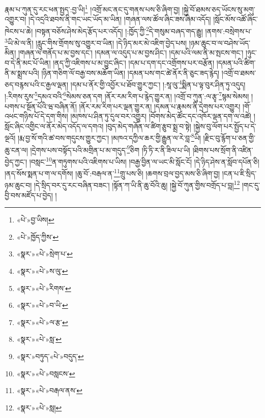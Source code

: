 རྣམ་པ་ཀུན་དུ་རང་ཕན་སྤྱད་:བྱ་ཡི།\footnote{«པེ་»བྱ་ཡིས།} །འགྲོ་མང་ནང་དུ་གནས་པས་ཅི་ཞིག་བྱ། །སྐྱེ་བོ་ཐམས་ཅད་ཡོངས་སུ་མགུ་འགྱུར་བ། །དེ་འདྲའི་ཐབས་ནི་གང་ཡང་ཡོད་མ་ཡིན། །གཞན་ལས་ཚོལ་ཞིང་ཟས་ཞིམ་འདོད། །སློང་མོས་འཚོ་ཞིང་ཁེངས་པ་ཆེ། །བསྟན་བཅོས་ཤེས་མེད་རྩོད་པར་འདོད། །:ཁྱོད་ཀྱི་\footnote{«པེ་»ཁྱོད་ཀྱིས་}དེ་གསུམ་བཞད་གད་རྒྱུ། །ནགས་:བསྲེགས་པ་\footnote{«སྣར་»«པེ་»སྲེག་པ་}ཡི་མེ་ལ་ནི། །རླུང་གིས་གྲོགས་སུ་འགྱུར་བ་ཡིན། །དེ་ཉིད་མར་མེ་འཇིག་བྱེད་པས། །ཉམ་ཆུང་བ་ལ་བཤེས་ཡོད་མིན། །གཞན་ལ་གནོད་པ་མ་བྱས་དང་། །དམན་ལ་འདུད་པ་མ་བྱས་ཤིང་། །དམ་པའི་ལམ་ནི་མ་སྤངས་གང་། །ཉུང་བ་དེ་ནི་མང་པོ་ཡིན། །ནད་ཀྱི་འཇིགས་པ་མ་བྱུང་ཞིང་། །དམ་པ་དག་དང་འགྲོགས་པར་བརྩོན། །དམན་པའི་ཚིག་ནི་མ་སྨྲས་པའི། །ཉིན་གཅིག་ལོ་བརྒྱ་བས་མཆོག་ཡིན། །དམན་པས་གང་ཚེ་ནོར་ནི་ཅུང་ཟད་རྙེད། །འགྲོ་བ་ཐམས་ཅད་བརྙས་པའི་ང་རྒྱལ་ལྡན། །དམ་པ་ནོར་གྱི་འབྱོར་པ་ཐོབ་གྱུར་ཀྱང་། །:སཱ་ལུ་\footnote{«སྣར་»«པེ་»ས་ལུ་}སྨིན་པ་ལྟ་བུར་ཤིན་ཏུ་འདུད། །:རིགས་རུས་\footnote{«སྣར་»«པེ་»རིགས་}དམའ་བའི་\footnote{«སྣར་»«པེ་»བ་ཡི་}སེམས་ཅན་དག །ནོར་རམ་རིག་པ་རྙེད་གྱུར་ན། །འགྲོ་བ་ཀུན་:ལ་རྩྭ་\footnote{«སྣར་»«པེ་»ལ་རྩ་}སྙམ་སེམས། །པགས་པ་སྔོན་པོའི་ཝ་བཞིན་ནོ། །ནོར་རམ་རིག་པར་ལྡན་གྱུར་ན། །དམན་པ་རྣམས་ནི་དྲེགས་པར་འགྱུར། །གོ་འཕང་གཉིས་པོ་དེ་དག་གིས། །མཁས་པ་ཤིན་ཏུ་དུལ་བར་འགྱུར། །བོགས་མེད་ཚོང་དང་འཁོར་ལྡན་དག་ལ་འཚེ། །སློང་ཞིང་འགྱིང་ལ་ནོར་མེད་འདོད་ལ་དགའ། །བུད་མེད་གཞོན་ལ་ཚིག་རྩུབ་སྨྲ་བ་སྟེ། །སྐྱེས་བུ་ལོག་པར་སྤྱོད་པ་དེ་ལྔའོ། །རྨ་བྱ་སོ་གའི་ཚ་བས་གདུངས་གྱུར་ཀྱང་། །མཁའ་དཀྱིལ་ཆར་གྱི་རྒྱུན་ལ་རེ་བླ་\footnote{«སྣར་»«པེ་»སླ་}ཡི། །རྫིང་བུ་རྙོག་པ་ཅན་གྱི་ཆུ་ངན་ལ། །དྲེགས་པས་བསྟོད་པའི་མགྲིན་པ་མ་གདུད་\footnote{«སྣར་»བཏུད་«པེ་»བདུད་}ཅིག །ཏི་ཏི་ར་ནི་ཟིལ་པ་ཡི། །ཐིགས་པས་སྲོག་ནི་འཛིན་བྱེད་ཀྱང་། །བསླང་\footnote{«སྣར་»«པེ་»བསླངས་}ན་གཏུགས་པའི་འཇིགས་པ་ཡིས། །བརྒྱ་བྱིན་ལ་ཡང་མི་སློང་ངོ། །དེ་ཉིད་ཤེས་ན་སློབ་དཔོན་ཅི། །ནད་སོས་སྨན་པ་ག་ལ་དགོས། །ཆུ་བོ་:བརྒལ་ན་\footnote{«སྣར་»«པེ་»བརྒལ་ནས་}གྲུ་པས་ཅི། །ཆགས་བྲལ་བྱད་མས་ཅི་ཞིག་བྱ། །ངན་པ་ཇི་སྲིད་ཉམ་ཆུང་བ། །དེ་སྲིད་བར་དུ་རང་བཞིན་བཟང་། །སྟོན་ཀ་ཡི་ནི་ཆུ་བོའི་ཆུ། །སྐྱེ་བོ་ཀུན་གྱིས་བགྲོད་པ་བླ།\footnote{«སྣར་»«པེ་»སླ།} །གང་དུ་བྱི་བས་མཛོད་པ་བྱེད། །
